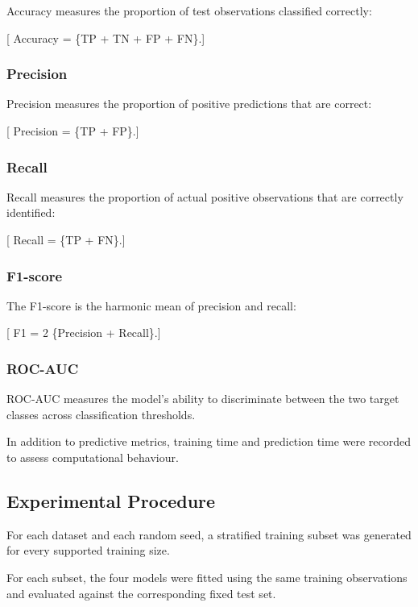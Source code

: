 Accuracy measures the proportion of test observations classified correctly:

{[} Accuracy =  \{TP + TN + FP + FN\}.{]}

\subsubsection{Precision}\label{precision}

Precision measures the proportion of positive predictions that are correct:

{[} Precision =  \{TP + FP\}.{]}

\subsubsection{Recall}\label{recall}

Recall measures the proportion of actual positive observations that are correctly identified:

{[} Recall =  \{TP + FN\}.{]}

\subsubsection{F1-score}\label{f1-score}

The F1-score is the harmonic mean of precision and recall:

{[} F1 = 2 \{Precision + Recall\}.{]}

\subsubsection{ROC-AUC}\label{roc-auc}

ROC-AUC measures the model's ability to discriminate between the two target classes across classification thresholds.

In addition to predictive metrics, training time and prediction time were recorded to assess computational behaviour.

\subsection{Experimental Procedure}\label{experimental-procedure}

For each dataset and each random seed, a stratified training subset was generated for every supported training size.

For each subset, the four models were fitted using the same training observations and evaluated against the corresponding fixed test set.

